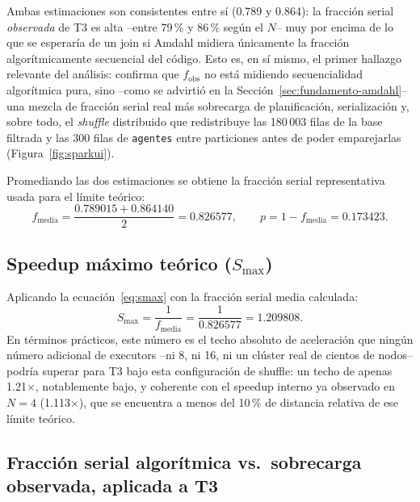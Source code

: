 \documentclass[11pt,a4paper]{article}
\begin{document}
Ambas estimaciones son consistentes entre s\'i (0.789 y 0.864): la fracci\'on
serial \emph{observada} de T3 es alta --entre 79\,\% y 86\,\% seg\'un el
$N$-- muy por encima de lo que se esperar\'ia de un join si Amdahl midiera
\'unicamente la fracci\'on algor\'itmicamente secuencial del c\'odigo. Esto
es, en s\'i mismo, el primer hallazgo relevante del an\'alisis: confirma que
$f_{\text{obs}}$ no est\'a midiendo secuencialidad algor\'itmica pura, sino
--como se advirti\'o en la Secci\'on~\ref{sec:fundamento-amdahl}-- una
mezcla de fracci\'on serial real m\'as sobrecarga de planificaci\'on,
serializaci\'on y, sobre todo, el \emph{shuffle} distribuido que redistribuye
las 180\,003 filas de la base filtrada y las 300 filas de \texttt{agentes}
entre particiones antes de poder emparejarlas (Figura~\ref{fig:sparkui}).

Promediando las dos estimaciones se obtiene la fracci\'on serial
representativa usada para el l\'imite te\'orico:
\[
f_{\text{media}} = \frac{0.789015 + 0.864140}{2} = 0.826577,
\qquad
p = 1 - f_{\text{media}} = 0.173423 .
\]

\subsection{Speedup m\'aximo te\'orico ($S_{\max}$)}

Aplicando la ecuaci\'on~\eqref{eq:smax} con la fracci\'on serial media
calculada:
\[
S_{\max} = \frac{1}{f_{\text{media}}} = \frac{1}{0.826577} = 1.209808 .
\]
En t\'erminos pr\'acticos, este n\'umero es el techo absoluto de aceleraci\'on
que ning\'un n\'umero adicional de executors --ni 8, ni 16, ni un cl\'uster
real de cientos de nodos-- podr\'ia superar para T3 bajo esta configuraci\'on
de shuffle: un techo de apenas 1.21$\times$, notablemente bajo, y coherente
con el speedup interno ya observado en $N=4$ (1.113$\times$), que se
encuentra a menos del 10\,\% de distancia relativa de ese l\'imite te\'orico.

\subsection{Fracci\'on serial algor\'itmica vs.\ sobrecarga observada, aplicada a T3}
\end{document}

